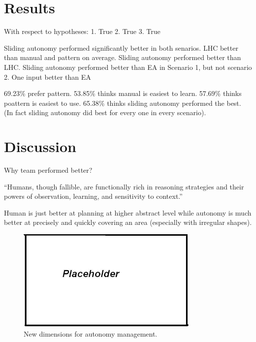 \documentclass[journal]{IEEEtran}
\begin{document}
\section{Results} 
\label{sec:Results}

With respect to hypotheses:
1. True
2. True
3. True

Sliding autonomy performed significantly better in both senarios.
LHC better than manual and pattern on average.
Sliding autonomy performed better than LHC.
Sliding autonomy performed better than EA in Scenario 1, but not scenario 2.
One input better than EA





69.23\% prefer pattern.
53.85\% thinks manual is easiest to learn. 
57.69\% thinks poattern is easiest to use.
65.38\% thinks sliding autonomy performed the best. (In fact sliding autonomy did best for every one in every scenario).



\section{Discussion} 
\label{sec:Discussion}

Why team performed better?

``Humans, though fallible, are functionally rich in reasoning strategies and their powers of observation, learning, and sensitivity to context.'' ~\cite{Bradshaw2013Seven}

Human is just better at planning at higher abstract level while autonomy is much better at precisely and quickly covering an area (especially with irregular shapes).


\begin{figure}
\centering
\includegraphics[width=3.5in]{placeholder.JPG}
\caption{New dimensions for autonomy management.}
\label{placeholder}
\end{figure}
\end{document}
